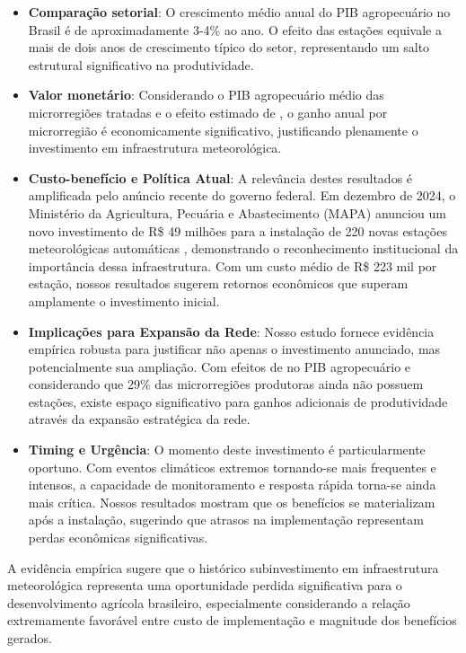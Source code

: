 \documentclass[
	12pt,				%
	oneside,			%
	a4paper,			%
	english,			%
	french,				%
	spanish,			%
	brazil				%
	]{abntex2}
\begin{document}
\begin{itemize}
\item \textbf{Comparação setorial}: O crescimento médio anual do PIB agropecuário no Brasil é de aproximadamente 3-4\% ao ano. O efeito das estações equivale a mais de dois anos de crescimento típico do setor, representando um salto estrutural significativo na produtividade.

\item \textbf{Valor monetário}: Considerando o PIB agropecuário médio das microrregiões tratadas e o efeito estimado de \mainattpct, o ganho anual por microrregião é economicamente significativo, justificando plenamente o investimento em infraestrutura meteorológica.

\item \textbf{Custo-benefício e Política Atual}: A relevância destes resultados é amplificada pelo anúncio recente do governo federal. Em dezembro de 2024, o Ministério da Agricultura, Pecuária e Abastecimento (MAPA) anunciou um novo investimento de R\$ 49 milhões para a instalação de 220 novas estações meteorológicas automáticas \cite{mapa2024}, demonstrando o reconhecimento institucional da importância dessa infraestrutura. Com um custo médio de R\$ 223 mil por estação, nossos resultados sugerem retornos econômicos que superam amplamente o investimento inicial.

\item \textbf{Implicações para Expansão da Rede}: Nosso estudo fornece evidência empírica robusta para justificar não apenas o investimento anunciado, mas potencialmente sua ampliação. Com efeitos de \mainattpct{} no PIB agropecuário e considerando que 29\% das microrregiões produtoras ainda não possuem estações, existe espaço significativo para ganhos adicionais de produtividade através da expansão estratégica da rede.

\item \textbf{Timing e Urgência}: O momento deste investimento é particularmente oportuno. Com eventos climáticos extremos tornando-se mais frequentes e intensos, a capacidade de monitoramento e resposta rápida torna-se ainda mais crítica. Nossos resultados mostram que os benefícios se materializam após a instalação, sugerindo que atrasos na implementação representam perdas econômicas significativas.
\end{itemize}

A evidência empírica sugere que o histórico subinvestimento em infraestrutura meteorológica representa uma oportunidade perdida significativa para o desenvolvimento agrícola brasileiro, especialmente considerando a relação extremamente favorável entre custo de implementação e magnitude dos benefícios gerados.
\end{document}
